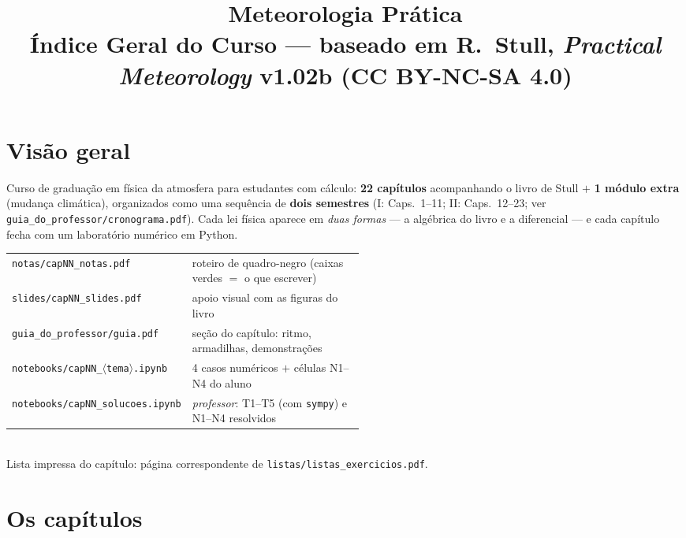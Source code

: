 \documentclass[11pt]{article}
\title{Meteorologia Prática\\
{\large Índice Geral do Curso --- baseado em R.~Stull,
\emph{Practical Meteorology} v1.02b (CC BY-NC-SA 4.0)}}
\author{}
\date{}
\begin{document}
\maketitle
\thispagestyle{fancy}

\section*{Visão geral}

Curso de graduação em física da atmosfera para estudantes com cálculo:
\textbf{22 capítulos} acompanhando o livro de Stull $+$ \textbf{1
módulo extra} (mudança climática), organizados como uma sequência de
\textbf{dois semestres} (I: Caps.~1--11; II: Caps.~12--23; ver
\texttt{guia\_do\_professor/cronograma.pdf}). Cada lei física aparece
em \emph{duas formas} — a algébrica do livro e a diferencial — e cada
capítulo fecha com um laboratório numérico em Python.

\begin{caixaindice}
\begin{tabular}{@{}lp{0.52\linewidth}@{}}
\texttt{notas/capNN\_notas.pdf} & roteiro de quadro-negro (caixas
verdes $=$ o que escrever)\\
\texttt{slides/capNN\_slides.pdf} & apoio visual com as figuras do
livro\\
\texttt{guia\_do\_professor/guia.pdf} & seção do capítulo: ritmo,
armadilhas, demonstrações\\
\texttt{notebooks/capNN\_$\langle$tema$\rangle$.ipynb} & 4 casos
numéricos $+$ células N1--N4 do aluno\\
\texttt{notebooks/capNN\_solucoes.ipynb} & \emph{professor}: T1--T5
(com \texttt{sympy}) e N1--N4 resolvidos\\
\end{tabular}\\[3pt]
Lista impressa do capítulo: página correspondente de
\texttt{listas/listas\_exercicios.pdf}.
\end{caixaindice}

\section*{Os capítulos}
\end{document}
